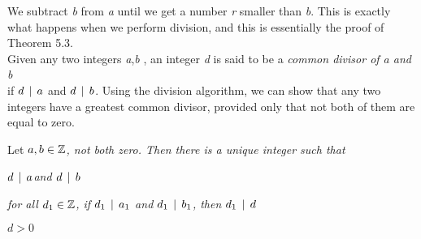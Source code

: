 \documentclass{amsbook}
\author{yagmur.dardagan }
\date{December 2016}
\begin{document}
\setcounter{page}{38}
\noindent We subtract \textit{b} from \textit{a} until we get a number \textit{r} smaller than \textit{b}. This is exactly \\
what happens when we perform division, and this is essentially the proof of Theorem 5.3.
\\
\noindent Given any two integers \textit{a},\textit{b} , an integer \textit{d} is said to be a \textit{common divisor of a and b}\\ if \textit{$d \, \mid \,  a$} and \textit{$d  \, \mid \,  b$}. Using the division algorithm, we can show that any two integers have a greatest common divisor, provided only that not both of them are equal to zero. \\

\begin{thm}
Let \textit{$a,b \in \mathbb{Z}$, not both zero. Then there is a unique integer such that}
    \begin{hEnumerateRoman}
    
        \item \textit{$d \, \mid \,  a $and $d  \, \mid \,  b$} 
        \item \textit{for all $d_1 \in \mathbb{Z}$, if $d_1 \, \mid \,  a_1$ and $d_1 \, \mid \,  b_1$, then $d_1 \, \mid \,  d$ } 
        \item \textit{$d > 0$} 
    \end{hEnumerateRoman}

\end{thm}
\end{document}

